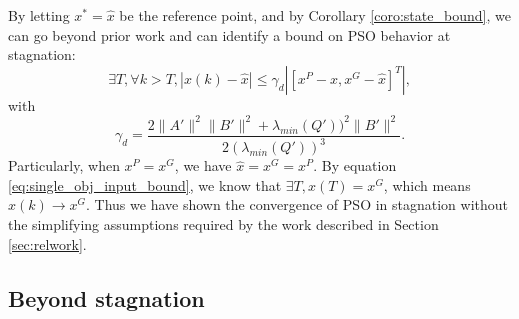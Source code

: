 \documentclass{sig-alternate}
\begin{document}
By letting $ x^{*} = \hat{x} $ be the reference point, and
by Corollary \ref{coro:state_bound}, we can go beyond prior work and can identify a bound on PSO behavior at stagnation:
\begin{equation}
\label{eq:single_obj_input_bound}
\exists T, \forall k > T, 
| x(k) - \hat{x} | \leq  \gamma_{d} | [ x^{P} - \hat{x}, x^{G} - \hat{x} ]^{T} |,
\end{equation}
with 
\begin{equation}
\gamma_{d} = \frac{ 2 \lVert A' \rVert^{2} \lVert B' \rVert^{2} + \lambda_{min}(Q') )^{2} \lVert B' \rVert^{2} }{ 2( \lambda_{min}(Q') )^{3} }.
\end{equation}
Particularly, when $ x^{P} = x^{G} $, we have
$ \hat{x} = x^{G} = x^{P} $.
By equation \eqref{eq:single_obj_input_bound}, we know that
$ \exists T , x(T) = x^{G} $, 
which means $ x(k) \rightarrow x^{G} $.
Thus we have shown the convergence of PSO in stagnation without the simplifying assumptions required by the work described in Section \ref{sec:relwork}.

\subsection{Beyond stagnation}
\end{document}
